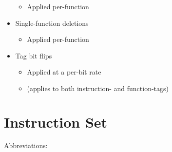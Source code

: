 \documentclass[
]{book}
\providecommand{\tightlist}{%
  \setlength{\itemsep}{0pt}\setlength{\parskip}{0pt}}
\begin{document}
\begin{itemize}
  \begin{itemize}
  \tightlist
  \item
    Applied per-function
  \end{itemize}
\item
  Single-function deletions

  \begin{itemize}
  \tightlist
  \item
    Applied per-function
  \end{itemize}
\item
  Tag bit flips

  \begin{itemize}
  \tightlist
  \item
    Applied at a per-bit rate
  \item
    (applies to both instruction- and function-tags)
  \end{itemize}
\end{itemize}

\hypertarget{instruction-set}{%
\section{Instruction Set}\label{instruction-set}}

Abbreviations:
\end{document}
